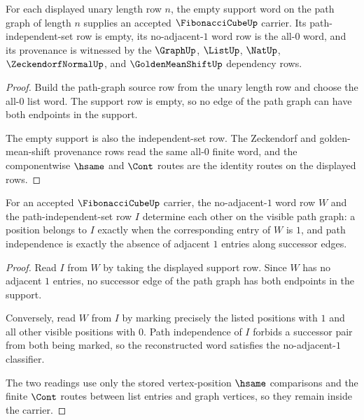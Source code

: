 \begin{theorem}
\label{thm:fibonacci-cube-carrier-habitation}
For each displayed unary length row $n$, the empty support word on the path graph of length $n$ supplies an accepted $\FibonacciCubeUp$ carrier. Its path-independent-set row is empty, its no-adjacent-$1$ word row is the all-$0$ word, and its provenance is witnessed by the $\GraphUp$, $\ListUp$, $\NatUp$, $\ZeckendorfNormalUp$, and $\GoldenMeanShiftUp$ dependency rows.
\end{theorem}
\begin{proof}
Build the path-graph source row from the unary length row and choose the all-$0$ list word. The support row is empty, so no edge of the path graph can have both endpoints in the support.

The empty support is also the independent-set row. The Zeckendorf and golden-mean-shift provenance rows read the same all-$0$ finite word, and the componentwise $\hsame$ and $\Cont$ routes are the identity routes on the displayed rows.
\end{proof}

\begin{theorem}
\label{thm:fibonacci-cube-word-path-independent-correspondence}
For an accepted $\FibonacciCubeUp$ carrier, the no-adjacent-$1$ word row $W$ and the path-independent-set row $I$ determine each other on the visible path graph: a position belongs to $I$ exactly when the corresponding entry of $W$ is $1$, and path independence is exactly the absence of adjacent $1$ entries along successor edges.
\end{theorem}
\begin{proof}
Read $I$ from $W$ by taking the displayed support row. Since $W$ has no adjacent $1$ entries, no successor edge of the path graph has both endpoints in the support.

Conversely, read $W$ from $I$ by marking precisely the listed positions with $1$ and all other visible positions with $0$. Path independence of $I$ forbids a successor pair from both being marked, so the reconstructed word satisfies the no-adjacent-$1$ classifier.

The two readings use only the stored vertex-position $\hsame$ comparisons and the finite $\Cont$ routes between list entries and graph vertices, so they remain inside the carrier.
\end{proof}

